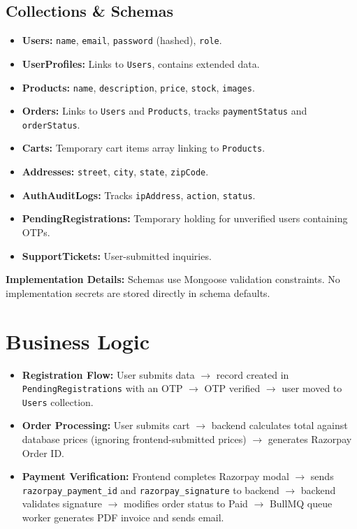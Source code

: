 \documentclass[11pt,a4paper]{article}
\begin{document}
\subsection*{Collections \& Schemas}
\begin{itemize}[leftmargin=*]
    \item \textbf{Users:} \texttt{name}, \texttt{email}, \texttt{password} (hashed), \texttt{role}.
    \item \textbf{UserProfiles:} Links to \texttt{Users}, contains extended data.
    \item \textbf{Products:} \texttt{name}, \texttt{description}, \texttt{price}, \texttt{stock}, \texttt{images}.
    \item \textbf{Orders:} Links to \texttt{Users} and \texttt{Products}, tracks
          \texttt{paymentStatus} and \texttt{orderStatus}.
    \item \textbf{Carts:} Temporary cart items array linking to \texttt{Products}.
    \item \textbf{Addresses:} \texttt{street}, \texttt{city}, \texttt{state}, \texttt{zipCode}.
    \item \textbf{AuthAuditLogs:} Tracks \texttt{ipAddress}, \texttt{action}, \texttt{status}.
    \item \textbf{PendingRegistrations:} Temporary holding for unverified users containing OTPs.
    \item \textbf{SupportTickets:} User-submitted inquiries.
\end{itemize}

\noindent\textbf{Implementation Details:} Schemas use Mongoose validation
constraints. No implementation secrets are stored directly in schema defaults.

\section{Business Logic}
\begin{itemize}[leftmargin=*]
    \item \textbf{Registration Flow:} User submits data $\rightarrow$ record
          created in \texttt{PendingRegistrations} with an OTP $\rightarrow$
          OTP verified $\rightarrow$ user moved to \texttt{Users} collection.
    \item \textbf{Order Processing:} User submits cart $\rightarrow$ backend
          calculates total against database prices (ignoring
          frontend-submitted prices) $\rightarrow$ generates Razorpay Order ID.
    \item \textbf{Payment Verification:} Frontend completes Razorpay modal
          $\rightarrow$ sends \texttt{razorpay\_payment\_id} and
          \texttt{razorpay\_signature} to backend $\rightarrow$ backend
          validates signature $\rightarrow$ modifies order status to Paid
          $\rightarrow$ BullMQ queue worker generates PDF invoice and sends
          email.
\end{itemize}
\end{document}
